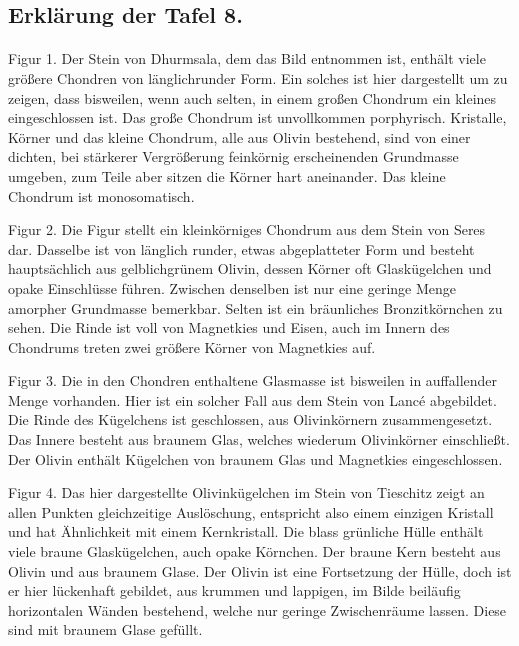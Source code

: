\documentclass[a4paper, 12pt, oneside]{article}
\begin{document}
\subsection{Erklärung der Tafel 8.}
\paragraph{}
Figur 1. Der Stein von Dhurmsala, dem das Bild entnommen ist, enthält viele größere Chondren von länglichrunder Form. Ein solches ist hier dargestellt um zu zeigen, dass bisweilen, wenn auch selten, in einem großen Chondrum ein kleines eingeschlossen ist. Das große Chondrum ist unvollkommen porphyrisch. Kristalle, Körner und das kleine Chondrum, alle aus Olivin bestehend, sind von einer dichten, bei stärkerer Vergrößerung feinkörnig erscheinenden Grundmasse umgeben, zum Teile aber sitzen die Körner hart aneinander. Das kleine Chondrum ist monosomatisch.

Figur 2. Die Figur stellt ein kleinkörniges Chondrum aus dem Stein von Seres dar. Dasselbe ist von länglich runder, etwas abgeplatteter Form und besteht hauptsächlich aus gelblichgrünem Olivin, dessen Körner oft Glaskügelchen und opake Einschlüsse führen. Zwischen denselben ist nur eine geringe Menge amorpher Grundmasse bemerkbar. Selten ist ein bräunliches Bronzitkörnchen zu sehen. Die Rinde ist voll von Magnetkies und Eisen, auch im Innern des Chondrums treten zwei größere Körner von Magnetkies auf.

Figur 3. Die in den Chondren enthaltene Glasmasse ist bisweilen in auffallender Menge vorhanden. Hier ist ein solcher Fall aus dem Stein von Lancé abgebildet. Die Rinde des Kügelchens ist geschlossen, aus Olivinkörnern zusammengesetzt. Das Innere besteht aus braunem Glas, welches wiederum Olivinkörner einschließt. Der Olivin enthält Kügelchen von braunem Glas und Magnetkies eingeschlossen.

Figur 4. Das hier dargestellte Olivinkügelchen im Stein von Tieschitz zeigt an allen Punkten gleichzeitige Auslöschung, entspricht also einem einzigen Kristall und hat Ähnlichkeit mit einem Kernkristall. Die blass grünliche Hülle enthält viele braune Glaskügelchen, auch opake Körnchen. Der braune Kern besteht aus Olivin und aus braunem Glase. Der Olivin ist eine Fortsetzung der Hülle, doch ist er hier lückenhaft gebildet, aus krummen und lappigen, im Bilde beiläufig horizontalen Wänden bestehend, welche nur geringe Zwischenräume lassen. Diese sind mit braunem Glase gefüllt.
\clearpage
\end{document}
